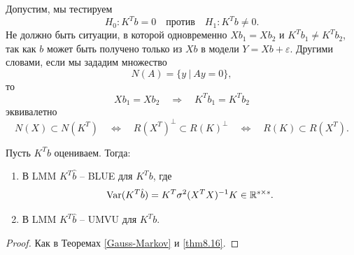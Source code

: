 \begin{exmp}
	Допустим, мы тестируем
	\[H_0: K^Tb = 0 \quad \text{против} \quad H_1: K^Tb \neq 0. \]
	Не должно быть ситуации, в которой одновременно $Xb_1 = Xb_2$ и $K^Tb_1 \neq K^Tb_2$, так как $b$ может быть получено только из $Xb$ в модели $Y = Xb + \varepsilon$. Другими словами, если мы зададим множество
	\[ N(A) = \{ y\ |\ Ay=0 \},\]
	то
	\[ Xb_1 = Xb_2 \quad \Longrightarrow \quad K^Tb_1 = K^Tb_2 \]
	эквивалетно
	\[ N(X) \subset N(K^T)\quad \Longleftrightarrow \quad R(X^T)^\perp \subset R(K)^\perp \quad \Longleftrightarrow \quad R(K) \subset R(X^T). \]
\end{exmp}

\begin{thm}
	Пусть $K^Tb$ оцениваем. Тогда:
	\begin{enumerate}
		\item В LMM $K^T\hat{b}$ -- BLUE для $K^Tb$, где
		\[ \mathrm{Var}(K^T\hat{b}) = K^T \sigma^2(X^TX)^{-1}K \in \mathbb{R}^{s \times s}. \]
		\item В LMM $K^T\hat{b}$ -- UMVU для $K^Tb$.
	\end{enumerate}
\end{thm}
\begin{proof}
	Как в Теоремах \ref{Gauss-Markov} и \ref{thm8.16}.
\end{proof}

